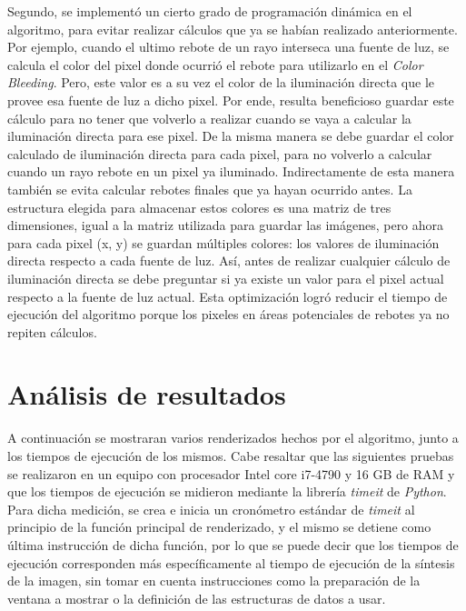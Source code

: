 \documentclass[conference]{IEEEtran}
\begin{document}
Segundo, se implementó un cierto grado de programación dinámica en el algoritmo, para evitar realizar cálculos que ya se habían realizado anteriormente. Por ejemplo, cuando el ultimo rebote de un rayo interseca una fuente de luz, se calcula el color del pixel donde ocurrió el rebote para utilizarlo en el \textit{Color Bleeding}. Pero, este valor es a su vez el color de la iluminación directa que le provee esa fuente de luz a dicho pixel. Por ende, resulta beneficioso guardar este cálculo para no tener que volverlo a realizar cuando se vaya a calcular la iluminación directa para ese pixel. De la misma manera se debe guardar el color calculado de iluminación directa para cada pixel, para no volverlo a calcular cuando un rayo rebote en un pixel ya iluminado. Indirectamente de esta manera también se evita calcular rebotes finales que ya hayan ocurrido antes. La estructura elegida para almacenar estos colores es una matriz de tres dimensiones, igual a la matriz utilizada para guardar las imágenes, pero ahora para cada pixel (x, y) se guardan múltiples colores: los valores de iluminación directa respecto a cada fuente de luz. Así, antes de realizar cualquier cálculo de iluminación directa se debe preguntar si ya existe un valor para el pixel actual respecto a la fuente de luz actual. Esta optimización logró reducir el tiempo de ejecución del algoritmo porque los pixeles en áreas potenciales de rebotes ya no repiten cálculos.

\section{Análisis de resultados}

A continuación se mostraran varios renderizados hechos por el algoritmo, junto a los tiempos de ejecución de los mismos. Cabe resaltar que las siguientes pruebas se realizaron en un equipo con procesador Intel core i7-4790 y 16 GB de RAM y que los tiempos de ejecución se midieron mediante la librería \textit{timeit} de \textit{Python}. Para dicha medición, se crea e inicia un cronómetro estándar de \textit{timeit} al principio de la función principal de renderizado, y el mismo se detiene como última instrucción de dicha función, por lo que se puede decir que los tiempos de ejecución corresponden más específicamente al tiempo de ejecución de la síntesis de la imagen, sin tomar en cuenta instrucciones como la preparación de la ventana a mostrar o la definición de las estructuras de datos a usar. 
\end{document}
